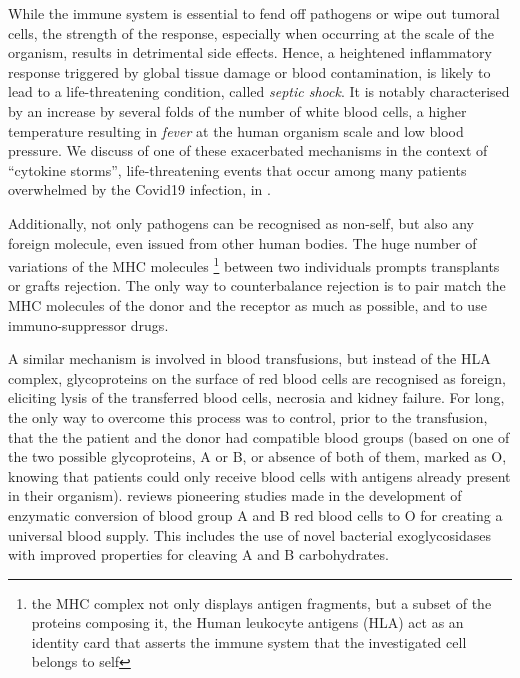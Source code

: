 While the immune system is essential to fend off pathogens or wipe out tumoral cells, the strength of the response, especially when occurring at the scale of the organism, results in  detrimental side effects. Hence, a heightened inflammatory response triggered by global tissue damage or blood contamination, is likely to lead to a life-threatening condition, called \emph{septic shock}. It is notably characterised by an increase by several folds of the number of white blood cells, a higher temperature resulting in \emph{fever} at the human organism scale and low blood pressure. We discuss of one of these exacerbated mechanisms in the context of \enquote{cytokine storms}, life-threatening events that occur among many patients overwhelmed by the Covid19 infection, in . 

Additionally, not only pathogens can be recognised as non-self, but also any foreign molecule, even issued from other human bodies. The huge number of variations of the  MHC molecules \footnote{the MHC complex not only displays antigen fragments, but a subset of the proteins composing it, the Human leukocyte antigens (HLA) act as an identity card that asserts the immune system that the investigated cell belongs to self} between two individuals prompts transplants or grafts rejection. The only way to counterbalance rejection is to pair match the MHC molecules of the donor and the receptor as much as possible, and to use immuno-suppressor drugs.

A similar mechanism is involved in blood transfusions, but instead of the HLA complex, glycoproteins on the surface of red blood cells are recognised as foreign, eliciting lysis of the transferred blood cells, necrosia and kidney failure. For long, the only way to overcome this process was to control, prior to the transfusion, that the the patient and the donor had compatible blood groups (based on one of the two possible glycoproteins, A or B,  or absence of both of them, marked as O, knowing that patients could only receive blood cells with antigens already present in their organism).
\autocite{olsson_clausen08} reviews pioneering studies made in the development of enzymatic conversion of blood group A and B red blood cells to O for creating a universal blood supply. This includes the use of novel bacterial exoglycosidases with improved properties for cleaving A and B carbohydrates.


